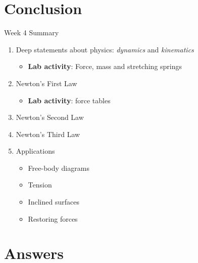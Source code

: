 \documentclass{beamer}
\begin{document}
\section{Conclusion}

\begin{frame}{Week 4 Summary}
\begin{enumerate}
\item Deep statements about physics: \textit{dynamics} and \textit{kinematics}
\begin{itemize}
\item \textbf{Lab activity}: Force, mass and stretching springs
\end{itemize}
\item Newton's \alert{First Law}
\begin{itemize}
\item \textbf{Lab activity}: force tables
\end{itemize}
\item Newton's \alert{Second Law}
\item Newton's \alert{Third Law}
\item Applications
\begin{itemize}
\item Free-body diagrams
\item Tension
\item Inclined surfaces
\item Restoring forces
\end{itemize}
\end{enumerate}
\end{frame}

\section{Answers}
\end{document}
